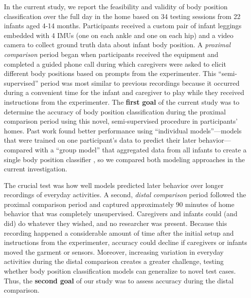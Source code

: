 \documentclass[
  man]{apa6}
\begin{document}
In the current study, we report the feasibility and validity of body position classification over the full day in the home based on 34 testing sessions from 22 infants aged 4-14 months. Participants received a custom pair of infant leggings embedded with 4 IMUs (one on each ankle and one on each hip) and a video camera to collect ground truth data about infant body position. A \emph{proximal comparison} period began when participants received the equipment and completed a guided phone call during which caregivers were asked to elicit different body positions based on prompts from the experimenter. This ``semi-supervised'' period was most similar to previous recordings because it occurred during a convenient time for the infant and caregiver to play while they received instructions from the experimenter. The \textbf{first goal} of the current study was to determine the accuracy of body position classification during the proximal comparison period using this novel, semi-supervised procedure in participants' homes. Past work found better performance using ``individual models''---models that were trained on one participant's data to predict their later behavior---compared with a ``group model'' that aggregated data from all infants to create a single body position classifier \autocite{FranchakScott2021}, so we compared both modeling approaches in the current investigation.

The crucial test was how well models predicted later behavior over longer recordings of everyday activities. A second, \emph{distal comparison} period followed the proximal comparison period and captured approximately 90 minutes of home behavior that was completely unsupervised. Caregivers and infants could (and did) do whatever they wished, and no researcher was present. Because this recording happened a considerable amount of time after the initial setup and instructions from the experimenter, accuracy could decline if caregivers or infants moved the garment or sensors. Moreover, increasing variation in everyday activities during the distal comparison creates a greater challenge, testing whether body position classification models can generalize to novel test cases. Thus, the \textbf{second goal} of our study was to assess accuracy during the distal comparison.
\end{document}
